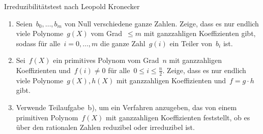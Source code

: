 \documentclass{algblatt}
\begin{document}
\begin{aufgabe}{Irreduzibilitätstest nach Leopold Kronecker}
\begin{enumerate}
\item Seien~$b_0,\ldots,b_m$ von Null verschiedene ganze Zahlen. Zeige, dass es
nur endlich viele Polynome~$g(X)$ vom Grad~$\leq m$ mit ganzzahligen Koeffizienten
gibt, sodass für alle~$i = 0,\ldots,m$ die ganze Zahl~$g(i)$ ein Teiler
von~$b_i$ ist.
\item Sei~$f(X)$ ein primitives Polynom vom Grad~$n$ mit ganzzahligen
Koeffizienten und~$f(i) \neq 0$ für alle~$0 \leq i \leq \frac{n}{2}$. Zeige,
dass es nur endlich viele Polynome~$g(X), h(X)$ mit ganzzahligen Koeffizienten
und~$f = g \cdot h$ gibt.
\item Verwende Teilaufgabe~b), um ein Verfahren anzugeben, das von einem
primitiven Polynom~$f(X)$ mit ganzzahligen Koeffizienten feststellt, ob es
über den rationalen Zahlen reduzibel oder irreduzibel ist.
\end{enumerate}
\end{aufgabe}
\end{document}
